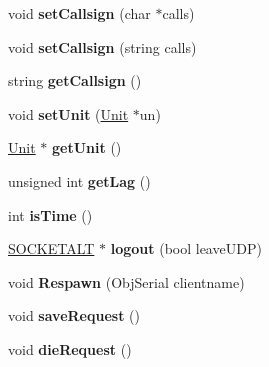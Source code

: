\begin{DoxyCompactItemize}
\item 
void {\bfseries set\+Callsign} (char $\ast$calls)\hypertarget{classNetClient_abeabad66c278a89591ec541e8d288221}{}\label{classNetClient_abeabad66c278a89591ec541e8d288221}

\item 
void {\bfseries set\+Callsign} (string calls)\hypertarget{classNetClient_a413e03272c250fa5f0d2c631dcbbee45}{}\label{classNetClient_a413e03272c250fa5f0d2c631dcbbee45}

\item 
string {\bfseries get\+Callsign} ()\hypertarget{classNetClient_a64a7294acfe132fef2ebabdccf08f75a}{}\label{classNetClient_a64a7294acfe132fef2ebabdccf08f75a}

\item 
void {\bfseries set\+Unit} (\hyperlink{classUnit}{Unit} $\ast$un)\hypertarget{classNetClient_af0a20288e9bbbf45b5c2ac8d10c93df2}{}\label{classNetClient_af0a20288e9bbbf45b5c2ac8d10c93df2}

\item 
\hyperlink{classUnit}{Unit} $\ast$ {\bfseries get\+Unit} ()\hypertarget{classNetClient_a0474e86b3072e725625e2eff9a34af68}{}\label{classNetClient_a0474e86b3072e725625e2eff9a34af68}

\item 
unsigned int {\bfseries get\+Lag} ()\hypertarget{classNetClient_ad9e444772086cffba9e081f963d15606}{}\label{classNetClient_ad9e444772086cffba9e081f963d15606}

\item 
int {\bfseries is\+Time} ()\hypertarget{classNetClient_ac6c195972678a05bb993ba158e38eb17}{}\label{classNetClient_ac6c195972678a05bb993ba158e38eb17}

\item 
\hyperlink{classSOCKETALT}{S\+O\+C\+K\+E\+T\+A\+LT} $\ast$ {\bfseries logout} (bool leave\+U\+DP)\hypertarget{classNetClient_ad6110e1f462f83a0005b0d44362fcda8}{}\label{classNetClient_ad6110e1f462f83a0005b0d44362fcda8}

\item 
void {\bfseries Respawn} (Obj\+Serial clientname)\hypertarget{classNetClient_a26a4a41138fc9cd1bccd34ae3f56de6d}{}\label{classNetClient_a26a4a41138fc9cd1bccd34ae3f56de6d}

\item 
void {\bfseries save\+Request} ()\hypertarget{classNetClient_a04896a2b7d21ff285ac75adca6e965b8}{}\label{classNetClient_a04896a2b7d21ff285ac75adca6e965b8}

\item 
void {\bfseries die\+Request} ()\hypertarget{classNetClient_a8dee3cc2df3ba8403d13915c12a0e148}{}\label{classNetClient_a8dee3cc2df3ba8403d13915c12a0e148}


\end{DoxyCompactItemize}
